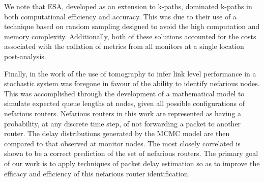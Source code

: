 We note that ESA, developed as an extension to k-paths, dominated k-paths in both computational efficiency and accuracy. This was due to their use of a technique based on random sampling designed to avoid the high computation and memory complexity. Additionally, both of these solutions accounted for the costs associated with the collation of metrics from all monitors at a single location post-analysis.\par
Finally, in the work of \cite{barnes_stochastic_2020} the use of tomography to infer link level performance in a stochastic system was foregone in favour of the ability to identify nefarious nodes. This was accomplished through the development of a mathematical model to simulate expected queue lengths at nodes, given all possible configurations of nefarious routers. Nefarious routers in this work are represented as having a probability, at any discrete time step, of not forwarding a packet to another router. The delay distributions generated by the MCMC model are then compared to that observed at monitor nodes. The most closely correlated is shown to be a correct prediction of the set of nefarious routers. The primary goal of our work is to apply techniques of packet delay estimation so as to improve the efficacy and efficiency of this nefarious router identification.\par
